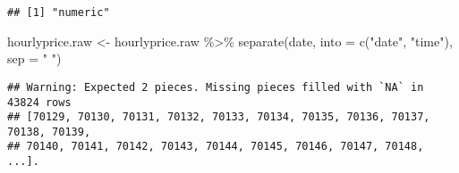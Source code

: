 \documentclass[
]{article}
\newenvironment{Shaded}{\begin{snugshade}}{\end{snugshade}}
\newcommand{\AttributeTok}[1]{\textcolor[rgb]{0.77,0.63,0.00}{#1}}
\newcommand{\FunctionTok}[1]{\textcolor[rgb]{0.00,0.00,0.00}{#1}}
\newcommand{\NormalTok}[1]{#1}
\newcommand{\OtherTok}[1]{\textcolor[rgb]{0.56,0.35,0.01}{#1}}
\newcommand{\SpecialCharTok}[1]{\textcolor[rgb]{0.00,0.00,0.00}{#1}}
\newcommand{\StringTok}[1]{\textcolor[rgb]{0.31,0.60,0.02}{#1}}
\begin{document}
\begin{verbatim}
## [1] "numeric"
\end{verbatim}

\begin{Shaded}
\begin{Highlighting}[]
\NormalTok{hourlyprice.raw }\OtherTok{\textless{}{-}}\NormalTok{ hourlyprice.raw }\SpecialCharTok{\%\textgreater{}\%}
  \FunctionTok{separate}\NormalTok{(date, }\AttributeTok{into =} \FunctionTok{c}\NormalTok{(}\StringTok{"date"}\NormalTok{, }\StringTok{"time"}\NormalTok{), }\AttributeTok{sep =} \StringTok{" "}\NormalTok{)}
\end{Highlighting}
\end{Shaded}

\begin{verbatim}
## Warning: Expected 2 pieces. Missing pieces filled with `NA` in 43824 rows
## [70129, 70130, 70131, 70132, 70133, 70134, 70135, 70136, 70137, 70138, 70139,
## 70140, 70141, 70142, 70143, 70144, 70145, 70146, 70147, 70148, ...].
\end{verbatim}
\end{document}
